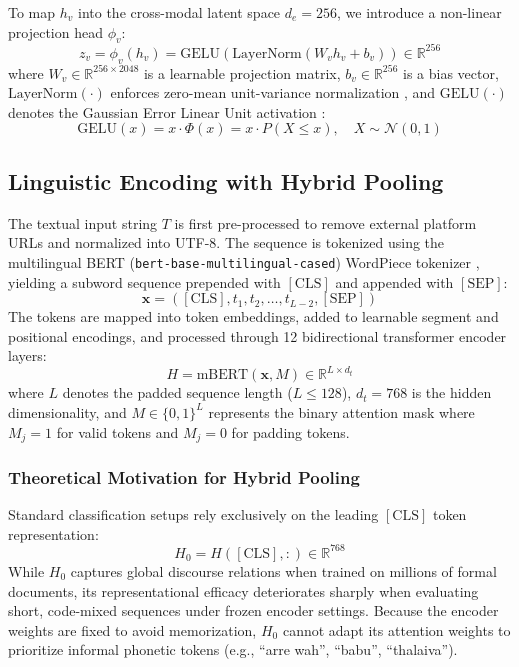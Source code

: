 \documentclass[10pt,journal,compsoc]{IEEEtran}
\begin{document}
To map $h_v$ into the cross-modal latent space $d_e = 256$, we introduce a non-linear projection head $\phi_v$:
\begin{equation}
    z_v = \phi_v(h_v) = \text{GELU}\left(\text{LayerNorm}(W_v h_v + b_v)\right) \in \mathbb{R}^{256}
\end{equation}
where $W_v \in \mathbb{R}^{256 \times 2048}$ is a learnable projection matrix, $b_v \in \mathbb{R}^{256}$ is a bias vector, $\text{LayerNorm}(\cdot)$ enforces zero-mean unit-variance normalization \cite{ba2016layer}, and $\text{GELU}(\cdot)$ denotes the Gaussian Error Linear Unit activation \cite{hendrycks2016gaussian}:
\begin{equation}
    \text{GELU}(x) = x \cdot \Phi(x) = x \cdot P(X \le x), \quad X \sim \mathcal{N}(0, 1)
\end{equation}

\subsection{Linguistic Encoding with Hybrid Pooling}
The textual input string $T$ is first pre-processed to remove external platform URLs and normalized into UTF-8. The sequence is tokenized using the multilingual BERT (\texttt{bert-base-multilingual-cased}) WordPiece tokenizer \cite{devlin2019bert}, yielding a subword sequence prepended with $[\text{CLS}]$ and appended with $[\text{SEP}]$:
\begin{equation}
    \mathbf{x} = ([\text{CLS}], t_1, t_2, \dots, t_{L-2}, [\text{SEP}])
\end{equation}
The tokens are mapped into token embeddings, added to learnable segment and positional encodings, and processed through 12 bidirectional transformer encoder layers:
\begin{equation}
    H = \text{mBERT}(\mathbf{x}, M) \in \mathbb{R}^{L \times d_t}
\end{equation}
where $L$ denotes the padded sequence length ($L \le 128$), $d_t = 768$ is the hidden dimensionality, and $M \in \{0, 1\}^L$ represents the binary attention mask where $M_j = 1$ for valid tokens and $M_j = 0$ for padding tokens.

\subsubsection{Theoretical Motivation for Hybrid Pooling}
Standard classification setups rely exclusively on the leading $[\text{CLS}]$ token representation:
\begin{equation}
    H_0 = H([\text{CLS}], :) \in \mathbb{R}^{768}
\end{equation}
While $H_0$ captures global discourse relations when trained on millions of formal documents, its representational efficacy deteriorates sharply when evaluating short, code-mixed sequences under frozen encoder settings. Because the encoder weights are fixed to avoid memorization, $H_0$ cannot adapt its attention weights to prioritize informal phonetic tokens (e.g., ``arre wah'', ``babu'', ``thalaiva'').
\end{document}
